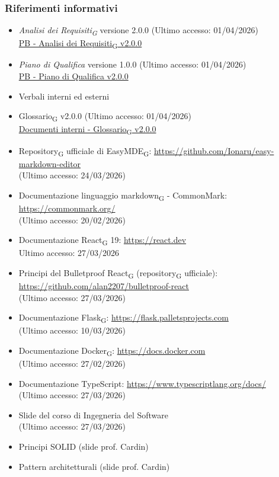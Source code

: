 \documentclass[11pt,a4paper]{article}
\newcommand{\gls}[1]{#1\textsubscript{G}}
\begin{document}
\subsubsection{Riferimenti informativi}
\begin{itemize}
    \item \textit{\gls{Analisi dei Requisiti}} versione 2.0.0 (Ultimo accesso: 01/04/2026)\\
    \href{https://byteme25.github.io/ByteMe/}{PB - \gls{Analisi dei Requisiti} v2.0.0}
    \item \textit{Piano di Qualifica} versione 1.0.0 (Ultimo accesso: 01/04/2026) \\
    \href{https://byteme25.github.io/ByteMe/}{PB - Piano di Qualifica v2.0.0}
    \item Verbali interni ed esterni
    \item \gls{Glossario} v2.0.0 (Ultimo accesso: 01/04/2026)\\
    \href{https://byteme25.github.io/ByteMe/files.html}{Documenti interni - \gls{Glossario} v2.0.0}
    \item \gls{Repository} ufficiale di \gls{EasyMDE}: \url{https://github.com/Ionaru/easy-markdown-editor}\\ (Ultimo accesso: 24/03/2026)
     \item Documentazione linguaggio \gls{markdown} - CommonMark: \url{https://commonmark.org/}\\ (Ultimo accesso: 20/02/2026)
    \item Documentazione \gls{React} 19: \url{https://react.dev}\\ Ultimo accesso: 27/03/2026
    \item Principi del Bulletproof \gls{React} (\gls{repository} ufficiale): \url{https://github.com/alan2207/bulletproof-react}\\ (Ultimo accesso: 27/03/2026)
    \item Documentazione \gls{Flask}: \url{https://flask.palletsprojects.com}\\ (Ultimo accesso: 10/03/2026)
    \item Documentazione \gls{Docker}: \url{https://docs.docker.com}\\ (Ultimo accesso: 27/02/2026)
    \item Documentazione TypeScript: \url{https://www.typescriptlang.org/docs/}\\ (Ultimo accesso: 27/03/2026)

    \item Slide del corso di Ingegneria del Software\\ (Ultimo accesso: 27/03/2026)
    \item Principi SOLID (slide prof. Cardin)
    \item Pattern architetturali (slide prof. Cardin)
\end{itemize}
\end{document}
